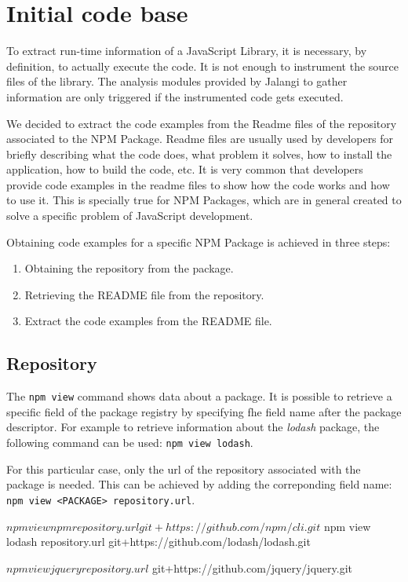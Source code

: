 \section{Initial code base}
To extract run-time information of a JavaScript Library, it is necessary, by definition, to actually execute the code. It is not enough to instrument the source files of the library. The analysis modules provided by Jalangi to gather information are only triggered if the instrumented code gets executed.

We decided to extract the code examples from the Readme files of the repository associated to the NPM Package. Readme files are usually used by developers for briefly describing what the code does, what problem it solves, how to install the application, how to build the code, etc. It is very common that developers provide code examples in the readme files to show how the code works and how to use it. This is specially true for NPM Packages, which are in general created to solve a specific problem of JavaScript development.

Obtaining code examples for a specific NPM Package is achieved in three steps:
\begin{enumerate}
  \item Obtaining the repository from the package.
  \item Retrieving the README file from the repository.
  \item Extract the code examples from the README file.
\end{enumerate}

\subsection{Repository}
The \texttt{npm view} command shows data about a package. It is possible to retrieve a specific field of the package registry by specifying fhe field name after the package descriptor. For example to retrieve information about the \textit{lodash} package, the following command can be used: \texttt{npm view lodash}.

For this particular case, only the url of the repository associated with the package is needed. This can be achieved by adding the correponding field name: \texttt{npm view <PACKAGE> repository.url}.

\begin{bashinline}
$ npm view npm repository.url
git+https://github.com/npm/cli.git

$ npm view lodash repository.url
git+https://github.com/lodash/lodash.git

$ npm view jquery repository.url$
git+https://github.com/jquery/jquery.git
\end{bashinline}

